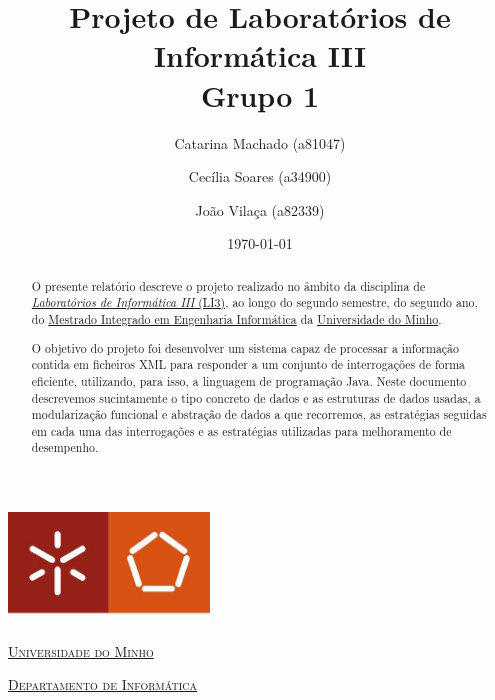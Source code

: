 \documentclass[a4paper]{article}
\begin{document}
\title{Projeto de Laboratórios de Informática III\\Grupo 1}
\author{Catarina Machado (a81047) \and Cecília Soares (a34900) \and João Vilaça (a82339)}
\date{\today}

\begin{titlepage}

  \thispagestyle{empty}
  \begin{center}
  \begin{minipage}{0.75\linewidth}
      \centering
      \includegraphics[width=0.4\textwidth]{imgs/eng.jpeg}\par\vspace{1cm}
      \vspace{1.5cm}
      \href{https://www.uminho.pt/PT}{\scshape\LARGE Universidade do Minho} \par
      \vspace{1cm}
      \href{https://www.di.uminho.pt/}{\scshape\Large Departamento de Informática} \par
      \vspace{1.5cm}

  \maketitle

  \end{minipage}
  \end{center}
  \clearpage

 \end{titlepage}


\begin{abstract}
O presente relatório descreve o projeto realizado no âmbito da disciplina de
\href{http://miei.di.uminho.pt/plano_estudos.html#laborat_rios_de_inform_tica_iii}
{\emph {Laboratórios de Informática III} (LI3)}, ao longo do segundo semestre,
do segundo ano, do \href{http://miei.di.uminho.pt}{Mestrado Integrado em Engenharia Informática}
da \href{https://www.uminho.pt}{Universidade do Minho}.

O objetivo do projeto foi desenvolver um sistema capaz de processar a informação
contida em ficheiros XML para responder a um conjunto de interrogações de forma
eficiente, utilizando, para isso, a linguagem de programação Java. Neste documento
descrevemos sucintamente o tipo concreto de dados e as estruturas de dados usadas,
a modularização funcional e abstração de dados a que recorremos, as estratégias seguidas
em cada uma das interrogações e as estratégias utilizadas para melhoramento de desempenho.

\end{abstract}
\pagebreak
\end{document}
